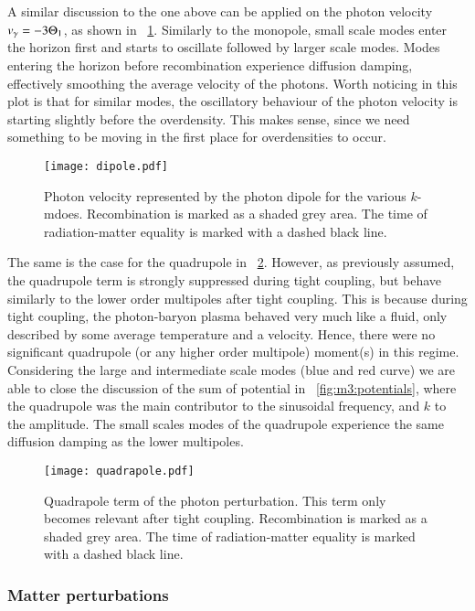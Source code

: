     A similar discussion to the one above can be applied on the photon velocity $v_\gamma = -3\Theta_1$, as shown in ~\cref{fig:m3:dipole}. Similarly to the monopole, small scale modes enter the horizon first and starts to oscillate followed by larger scale modes. Modes entering the horizon before recombination experience diffusion damping, effectively smoothing the average velocity of the photons. Worth noticing in this plot is that for similar modes, the oscillatory behaviour of the photon velocity is starting slightly before the overdensity. This makes sense, since we need something to be moving in the first place for overdensities to occur. 

    \begin{figure}
        \texttt{[image: dipole.pdf]}
        \caption{Photon velocity represented by the photon dipole for the various $k$-mdoes. Recombination is marked as a shaded grey area. The time of radiation-matter equality is marked with a dashed black line.}
        \label{fig:m3:dipole}
    \end{figure}

    The same is the case for the quadrupole in ~\cref{fig:m3:quadrapole}. However, as previously assumed, the quadrupole term is strongly suppressed during tight coupling, but behave similarly to the lower order multipoles after tight coupling. This is because during tight coupling, the photon-baryon plasma behaved very much like a fluid, only described by some average temperature and a velocity. Hence, there were no significant quadrupole (or any higher order multipole) moment(s) in this regime. Considering the large and intermediate scale modes (blue and red curve) we are able to close the discussion of the sum of potential in ~\cref{fig:m3:potentials}, where the quadrupole was the main contributor to the sinusoidal frequency, and $k$ to the amplitude. The small scales modes of the quadrupole experience the same diffusion damping as the lower multipoles. 

    \begin{figure}
        \texttt{[image: quadrapole.pdf]}
        \caption{Quadrapole term of the photon perturbation. This term only becomes relevant after tight coupling. Recombination is marked as a shaded grey area. The time of radiation-matter equality is marked with a dashed black line.}
        \label{fig:m3:quadrapole}
    \end{figure}

\subsubsection{Matter perturbations}

